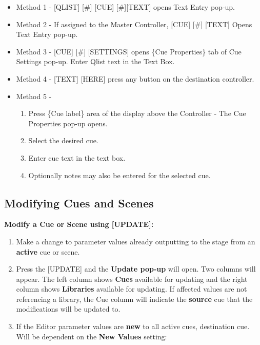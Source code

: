 \documentclass[
]{article}
\providecommand{\tightlist}{%
  \setlength{\itemsep}{0pt}\setlength{\parskip}{0pt}}
\begin{document}
\begin{itemize}
\item
  Method 1 - {[}QLIST{]} {[}\#{]} {[}CUE{]} {[}\#{]}{[}TEXT{]} opens Text Entry pop-up.
\item
  Method 2 - If assigned to the Master Controller, {[}CUE{]} {[}\#{]} {[}TEXT{]} Opens Text Entry pop-up.
\item
  Method 3 - {[}CUE{]} {[}\#{]} {[}SETTINGS{]} opens \{Cue Properties\} tab of Cue Settings pop-up. Enter Qlist text in the Text Box.
\item
  Method 4 - {[}TEXT{]} {[}HERE{]} press any button on the destination controller.
\item
  Method 5 -

  \begin{enumerate}
  \def\labelenumi{\arabic{enumi}.}
  \tightlist
  \item
    Press \{Cue label\} area of the display above the Controller - The Cue Properties pop-up opens.
  \item
    Select the desired cue.
  \item
    Enter cue text in the text box.
  \item
    Optionally notes may also be entered for the selected cue.
  \end{enumerate}
\end{itemize}

\hypertarget{modifying-cues-and-scenes}{%
\subsection{Modifying Cues and Scenes}\label{modifying-cues-and-scenes}}

\textbf{Modify a Cue or Scene using {[}UPDATE{]}:}

\begin{enumerate}
\def\labelenumi{\arabic{enumi}.}
\item
  Make a change to parameter values already outputting to the stage from an \textbf{active} cue or scene.
\item
  Press the {[}UPDATE{]} and the \textbf{Update pop-up} will open. Two columns will appear. The left column shows \textbf{Cues} available for updating and the right column shows \textbf{Libraries} available for updating. If affected values are not referencing a library, the Cue column will indicate the \textbf{source} cue that the modifications will be updated to.
\item
  If the Editor parameter values are \textbf{new} to all active cues, destination cue. Will be dependent on the \textbf{New Values} setting:
\end{enumerate}
\end{document}
